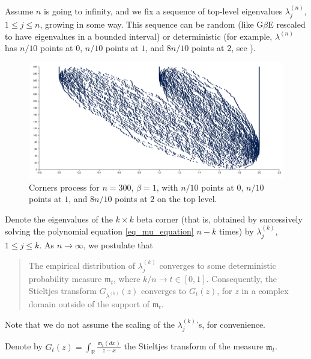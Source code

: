\documentclass[letterpaper,11pt,oneside,reqno]{article}
\numberwithin{equation}{section}
\theoremstyle{definition}
\begin{document}
Assume $n$ is going to infinity, and we fix a sequence of
top-level eigenvalues $\lambda^{(n)}_j$, $1\le j \le n$,
growing in some way. This sequence can be random
(like G$\beta$E rescaled to have eigenvalues in a bounded interval)
or deterministic
(for example, $\lambda^{(n)}$ has $n/10$ points at $0$,
$n/10$ points at $1$, and $8n/10$ points at $2$,
see ).
\begin{figure}[htpb]
	\centering
	\includegraphics[width=\textwidth]{./pictures/corners.png}
	\caption{Corners process for $n=300$,
	$\beta=1$, with $n/10$ points at $0$,
	$n/10$ points at $1$, and $8n/10$ points at $2$ on the top level.}
	\label{fig:corners}
\end{figure}

Denote the eigenvalues
of the $k\times k$ beta corner (that is,
obtained by successively solving the polynomial equation
\eqref{eq_mu_equation}
$n-k$ times) by $\lambda^{(k)}_j$, $1\le j \le k$.
As $n\to\infty$, we postulate that
\begin{quote}
	The empirical distribution of $\lambda^{(k)}_j$
	converges to some deterministic probability measure
	$\mathfrak{m}_t$, where $k/n\to t\in[0,1]$.
	Consequently, the Stieltjes transform $G_{\lambda^{(k)}}(z)$
	converges to $G_t(z)$, for $z$ in a complex domain
	outside of the support of $\mathfrak{m}_t$.
\end{quote}
Note that we do not assume the scaling of the
$\lambda^{(k)}_j$'s, for convenience.

Denote by $\displaystyle
G_t(z)=\int_{\mathbb{R}}\frac{\mathfrak{m}_t(dx)}{z-x}$
the Stieltjes transform of the measure $\mathfrak{m}_t$.
\end{document}
